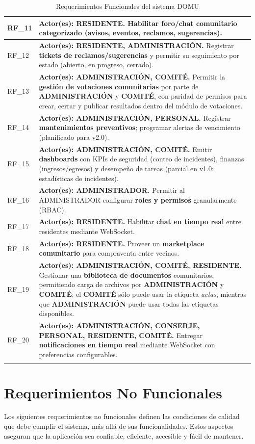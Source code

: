 {\begin{longtable}{|p{}|p{}|}
RF\_11 & \textbf{Actor(es): RESIDENTE.} Habilitar \textbf{foro/chat comunitario} categorizado (avisos, eventos, reclamos, sugerencias). \\ \hline
RF\_12 & \textbf{Actor(es): RESIDENTE, ADMINISTRACIÓN.} Registrar \textbf{tickets de reclamos/sugerencias} y permitir su seguimiento por estado (abierto, en progreso, cerrado). \\ \hline
RF\_13 & \textbf{Actor(es): ADMINISTRACIÓN, COMITÉ.} Permitir la \textbf{gestión de votaciones comunitarias} por parte de \textbf{ADMINISTRACIÓN} y \textbf{COMITÉ}, con paridad de permisos para crear, cerrar y publicar resultados dentro del módulo de votaciones. \\ \hline
RF\_14 & \textbf{Actor(es): ADMINISTRACIÓN, PERSONAL.} Registrar \textbf{mantenimientos preventivos}; programar alertas de vencimiento (planificado para v2.0). \\ \hline
RF\_15 & \textbf{Actor(es): ADMINISTRACIÓN, COMITÉ.} Emitir \textbf{dashboards} con KPIs de seguridad (conteo de incidentes), finanzas (ingresos/egresos) y desempeño de tareas (parcial en v1.0: estadísticas de incidentes). \\ \hline
RF\_16 & \textbf{Actor(es): ADMINISTRADOR.} Permitir al ADMINISTRADOR configurar \textbf{roles y permisos} granularmente (RBAC). \\ \hline
RF\_17 & \textbf{Actor(es): RESIDENTE.} Habilitar \textbf{chat en tiempo real} entre residentes mediante WebSocket. \\ \hline
RF\_18 & \textbf{Actor(es): RESIDENTE.} Proveer un \textbf{marketplace comunitario} para compraventa entre vecinos. \\ \hline
RF\_19 & \textbf{Actor(es): ADMINISTRACIÓN, COMITÉ, RESIDENTE.} Gestionar una \textbf{biblioteca de documentos} comunitarios, permitiendo carga de archivos por \textbf{ADMINISTRACIÓN} y \textbf{COMITÉ}; el \textbf{COMITÉ} sólo puede usar la etiqueta \textit{actas}, mientras que \textbf{ADMINISTRACIÓN} puede usar todas las etiquetas disponibles. \\ \hline
RF\_20 & \textbf{Actor(es): ADMINISTRACIÓN, CONSERJE, PERSONAL, RESIDENTE, COMITÉ.} Entregar \textbf{notificaciones en tiempo real} mediante WebSocket con preferencias configurables. \\ \hline
\caption{Requerimientos Funcionales del sistema DOMU}
\label{tab:rf}
\end{longtable}
}

\section{Requerimientos No Funcionales}
Los siguientes requerimientos no funcionales definen las condiciones de calidad que debe cumplir el sistema, más allá de sus funcionalidades. Estos aspectos aseguran que la aplicación sea confiable, eficiente, accesible y fácil de mantener.

